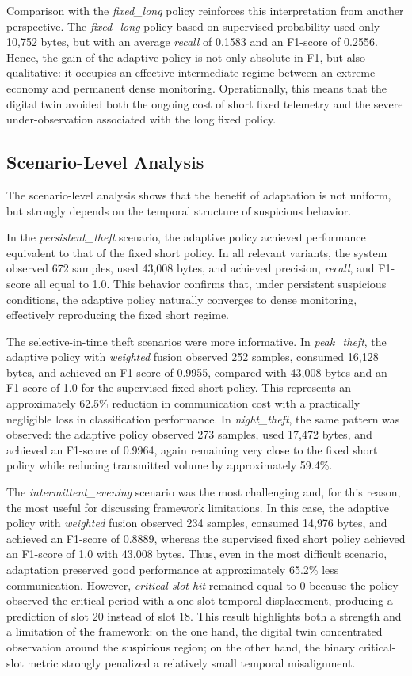 \documentclass[journal]{IEEEtran}
\begin{document}
Comparison with the \textit{fixed\_long} policy reinforces this interpretation from another perspective. The \textit{fixed\_long} policy based on supervised probability used only 10{,}752 bytes, but with an average \textit{recall} of 0.1583 and an F1-score of 0.2556. Hence, the gain of the adaptive policy is not only absolute in F1, but also qualitative: it occupies an effective intermediate regime between an extreme economy and permanent dense monitoring. Operationally, this means that the digital twin avoided both the ongoing cost of short fixed telemetry and the severe under-observation associated with the long fixed policy.


\subsection{Scenario-Level Analysis}
The scenario-level analysis shows that the benefit of adaptation is not uniform, but strongly depends on the temporal structure of suspicious behavior.

In the \textit{persistent\_theft} scenario, the adaptive policy achieved performance equivalent to that of the fixed short policy. In all relevant variants, the system observed 672 samples, used 43{,}008 bytes, and achieved precision, \textit{recall}, and F1-score all equal to 1.0. This behavior confirms that, under persistent suspicious conditions, the adaptive policy naturally converges to dense monitoring, effectively reproducing the fixed short regime.

The selective-in-time theft scenarios were more informative. In \textit{peak\_theft}, the adaptive policy with \textit{weighted} fusion observed 252 samples, consumed 16{,}128 bytes, and achieved an F1-score of 0.9955, compared with 43{,}008 bytes and an F1-score of 1.0 for the supervised fixed short policy. This represents an approximately 62.5\% reduction in communication cost with a practically negligible loss in classification performance. In \textit{night\_theft}, the same pattern was observed: the adaptive policy observed 273 samples, used 17{,}472 bytes, and achieved an F1-score of 0.9964, again remaining very close to the fixed short policy while reducing transmitted volume by approximately 59.4\%.

The \textit{intermittent\_evening} scenario was the most challenging and, for this reason, the most useful for discussing framework limitations. In this case, the adaptive policy with \textit{weighted} fusion observed 234 samples, consumed 14{,}976 bytes, and achieved an F1-score of 0.8889, whereas the supervised fixed short policy achieved an F1-score of 1.0 with 43{,}008 bytes. Thus, even in the most difficult scenario, adaptation preserved good performance at approximately 65.2\% less communication. However, \textit{critical slot hit} remained equal to 0 because the policy observed the critical period with a one-slot temporal displacement, producing a prediction of slot 20 instead of slot 18. This result highlights both a strength and a limitation of the framework: on the one hand, the digital twin concentrated observation around the suspicious region; on the other hand, the binary critical-slot metric strongly penalized a relatively small temporal misalignment.
\end{document}
